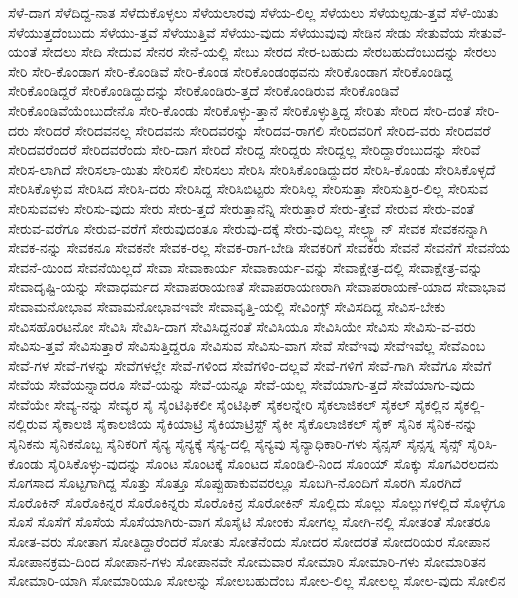 {ಸೆಳೆ-ದಾಗ
ಸೆಳೆದಿದ್ದ-ನಾತ
ಸೆಳೆದುಕೊಳ್ಳಲು
ಸೆಳೆಯಲಾರವು
ಸೆಳೆಯ-ಲಿಲ್ಲ
ಸೆಳೆಯಲು
ಸೆಳೆಯಲ್ಪಡು-ತ್ತವೆ
ಸೆಳೆ-ಯಿತು
ಸೆಳೆಯುತ್ತದೆಂಬುದು
ಸೆಳೆಯು-ತ್ತವೆ
ಸೆಳೆಯುತ್ತಿವೆ
ಸೆಳೆಯು-ವುದು
ಸೆಳೆಯುವುವು
ಸೇಡಿನ
ಸೇಡು
ಸೇತುವೆಯ
ಸೇತುವೆ-ಯಂತೆ
ಸೇದಲು
ಸೇದಿ
ಸೇದುವ
ಸೇನರ
ಸೇನೆ-ಯಲ್ಲಿ
ಸೇಬು
ಸೇರದ
ಸೇರ-ಬಹುದು
ಸೇರಬಹುದೆಂಬುದನ್ನು
ಸೇರಲು
ಸೇರಿ
ಸೇರಿ-ಕೊಂಡಾಗ
ಸೇರಿ-ಕೊಂಡಿವೆ
ಸೇರಿ-ಕೊಂಡ
ಸೇರಿಕೊಂಡಂಥವನು
ಸೇರಿಕೊಂಡಾಗ
ಸೇರಿಕೊಂಡಿದ್ದ
ಸೇರಿಕೊಂಡಿದ್ದರೆ
ಸೇರಿಕೊಂಡಿದ್ದುದನ್ನು
ಸೇರಿಕೊಂಡಿರು-ತ್ತದೆ
ಸೇರಿಕೊಂಡಿರುವ
ಸೇರಿಕೊಂಡಿವೆ
ಸೇರಿಕೊಂಡಿವೆಯೆಂಬುದೇನೊ
ಸೇರಿ-ಕೊಂಡು
ಸೇರಿಕೊಳ್ಳು-ತ್ತಾನೆ
ಸೇರಿಕೊಳ್ಳುತ್ತಿದ್ದ
ಸೇರಿತು
ಸೇರಿದ
ಸೇರಿ-ದಂತೆ
ಸೇರಿ-ದರು
ಸೇರಿದರೆ
ಸೇರಿದವನಲ್ಲ
ಸೇರಿದವನು
ಸೇರಿದವರನ್ನು
ಸೇರಿದವ-ರಾಗಲಿ
ಸೇರಿದವರಿಗೆ
ಸೇರಿದ-ವರು
ಸೇರಿದವರೆ
ಸೇರಿದವರೆಂದರೆ
ಸೇರಿದವರೆಂದು
ಸೇರಿ-ದಾಗ
ಸೇರಿದೆ
ಸೇರಿದ್ದ
ಸೇರಿದ್ದರು
ಸೇರಿದ್ದಲ್ಲ
ಸೇರಿದ್ದಾರೆಂಬುದನ್ನು
ಸೇರಿವೆ
ಸೇರಿಸ-ಲಾಗಿದೆ
ಸೇರಿಸಲಾ-ಯಿತು
ಸೇರಿಸಲಿ
ಸೇರಿಸಲು
ಸೇರಿಸಿ
ಸೇರಿಸಿಕೊಂಡಿದ್ದುದರ
ಸೇರಿಸಿ-ಕೊಂಡು
ಸೇರಿಸಿಕೊಳ್ಳದೆ
ಸೇರಿಸಿಕೊಳ್ಳುವ
ಸೇರಿಸಿದ
ಸೇರಿಸಿ-ದರು
ಸೇರಿಸಿದ್ದ
ಸೇರಿಸಿಬಿಟ್ಟರು
ಸೇರಿಸಿಲ್ಲ
ಸೇರಿಸುತ್ತಾ
ಸೇರಿಸುತ್ತಿರ-ಲಿಲ್ಲ
ಸೇರಿಸುವ
ಸೇರಿಸುವವಳು
ಸೇರಿಸು-ವುದು
ಸೇರು
ಸೇರು-ತ್ತದೆ
ಸೇರುತ್ತಾನೆನ್ನಿ
ಸೇರುತ್ತಾರೆ
ಸೇರು-ತ್ತೇವೆ
ಸೇರುವ
ಸೇರು-ವಂತೆ
ಸೇರುವ-ವರೆಗೂ
ಸೇರುವ-ವರೆಗೆ
ಸೇರುವುದಂತೂ
ಸೇರುವು-ದಕ್ಕೆ
ಸೇರು-ವುದಿಲ್ಲ
ಸೇಲ್ಸ್ಮ್ಯಾನ್
ಸೇವಕ
ಸೇವಕನನ್ನಾಗಿ
ಸೇವಕ-ನನ್ನು
ಸೇವಕನೂ
ಸೇವಕನೇ
ಸೇವಕ-ರಲ್ಲ
ಸೇವಕ-ರಾಗ-ಬೇಡಿ
ಸೇವಕರಿಗೆ
ಸೇವಕರು
ಸೇವನೆ
ಸೇವನೆಗೆ
ಸೇವನೆಯ
ಸೇವನೆ-ಯಿಂದ
ಸೇವನೆಯಿಲ್ಲದೆ
ಸೇವಾ
ಸೇವಾಕಾರ್ಯ
ಸೇವಾಕಾರ್ಯ-ವನ್ನು
ಸೇವಾಕ್ಷೇತ್ರ-ದಲ್ಲಿ
ಸೇವಾಕ್ಷೇತ್ರ-ವನ್ನು
ಸೇವಾದೃಷ್ಟಿ-ಯನ್ನು
ಸೇವಾಧರ್ಮದ
ಸೇವಾಪರಾಯಣತೆ
ಸೇವಾಪರಾಯಣರಾಗಿ
ಸೇವಾಪರಾಯಣೆ-ಯಾದ
ಸೇವಾಭಾವ
ಸೇವಾಮನೋಭಾವ
ಸೇವಾಮನೋಭಾವಇವೇ
ಸೇವಾವೃತ್ತಿ-ಯಲ್ಲಿ
ಸೇವಿಂಗ್ಸ್
ಸೇವಿಸದಿದ್ದ
ಸೇವಿಸ-ಬೇಕು
ಸೇವಿಸಹೊರಟನೋ
ಸೇವಿಸಿ
ಸೇವಿಸಿ-ದಾಗ
ಸೇವಿಸಿದ್ದನಂತೆ
ಸೇವಿಸಿಯೂ
ಸೇವಿಸಿಯೇ
ಸೇವಿಸು
ಸೇವಿಸು-ವ-ವರು
ಸೇವಿಸು-ತ್ತವೆ
ಸೇವಿಸುತ್ತಾರೆ
ಸೇವಿಸುತ್ತಿದ್ದರೂ
ಸೇವಿಸುವ
ಸೇವಿಸು-ವಾಗ
ಸೇವೆ
ಸೇವೆಇವು
ಸೇವೆಇವೆಲ್ಲ
ಸೇವೆಎಂಬ
ಸೇವೆ-ಗಳ
ಸೇವೆ-ಗಳನ್ನು
ಸೇವೆಗಳಲ್ಲೇ
ಸೇವೆ-ಗಳಿಂದ
ಸೇವೆಗಳಿಂ-ದಲ್ಲವೆ
ಸೇವೆ-ಗಳಿಗೆ
ಸೇವೆ-ಗಾಗಿ
ಸೇವೆಗೂ
ಸೇವೆಗೆ
ಸೇವೆಯ
ಸೇವೆಯನ್ನಾದರೂ
ಸೇವೆ-ಯನ್ನು
ಸೇವೆ-ಯನ್ನೂ
ಸೇವೆ-ಯಲ್ಲ
ಸೇವೆಯಾಗು-ತ್ತದೆ
ಸೇವೆಯಾಗು-ವುದು
ಸೇವೆಯೇ
ಸೇವ್ಯ-ನನ್ನು
ಸೇವ್ಯರ
ಸೈ
ಸೈಂಟಿಫಿಕಲೀ
ಸೈಂಟಿಫಿಕ್
ಸೈಕಲನ್ನೇರಿ
ಸೈಕಲಾಜಿಕಲ್
ಸೈಕಲ್
ಸೈಕಲ್ಲಿನ
ಸೈಕಲ್ಲಿ-ನಲ್ಲಿರುವ
ಸೈಕಾಲಜಿ
ಸೈಕಾಲಜಿಯ
ಸೈಕಿಯಾಟ್ರಿ
ಸೈಕಿಯಾಟ್ರಿಸ್ಟ್
ಸೈಕೀ
ಸೈಕೊಲಾಜಿಕಲ್
ಸೈಕ್
ಸೈನಿಕ
ಸೈನಿಕ-ನನ್ನು
ಸೈನಿಕನು
ಸೈನಿಕನೊಬ್ಬ
ಸೈನಿಕರಿಗೆ
ಸೈನ್ಯ
ಸೈನ್ಯಕ್ಕೆ
ಸೈನ್ಯ-ದಲ್ಲಿ
ಸೈನ್ಯವು
ಸೈನ್ಯಾಧಿಕಾರಿ-ಗಳು
ಸೈನ್ಸಸ್
ಸೈನ್ಸಸ್ನ
ಸೈನ್ಸ್
ಸೈರಿಸಿ-ಕೊಂಡು
ಸೈರಿಸಿಕೊಳ್ಳು-ವುದನ್ನು
ಸೊಂಟ
ಸೊಂಟಕ್ಕೆ
ಸೊಂಟದ
ಸೊಂಡಿಲಿ-ನಿಂದ
ಸೊಂಯ್
ಸೊಕ್ಕು
ಸೊಗವಿರಲದನು
ಸೊಗಸಾದ
ಸೊಟ್ಟಗಾಗಿದ್ದ
ಸೊತ್ತು
ಸೊತ್ತೂ
ಸೊಪ್ಪುಹಾಕುವವರಲ್ಲೂ
ಸೊಬಗಿ-ನೊಂದಿಗೆ
ಸೊರಗಿ
ಸೊರಗಿದೆ
ಸೊರೊಕಿನ್
ಸೊರೊಕಿನ್ನರ
ಸೊರೊಕಿನ್ನರು
ಸೊರೊಕಿನ್ರ
ಸೊರೋಕಿನ್
ಸೊಲ್ಲಿದು
ಸೊಲ್ಲು
ಸೊಲ್ಲುಗಳಲ್ಲಿದೆ
ಸೊಳ್ಳೆಗೂ
ಸೊಸೆ
ಸೊಸೆಗೆ
ಸೊಸೆಯ
ಸೊಸೆಯಾಗಿರು-ವಾಗ
ಸೊಸೈಟಿ
ಸೋಂಕು
ಸೋಗಲ್ಲ
ಸೋಗಿ-ನಲ್ಲಿ
ಸೋತಂತೆ
ಸೋತರೂ
ಸೋತ-ವರು
ಸೋತಾಗ
ಸೋತಿದ್ದಾರೆಂದರೆ
ಸೋತು
ಸೋತೆನೆಂದು
ಸೋದರ
ಸೋದರತೆ
ಸೋದರಿಯರ
ಸೋಪಾನ
ಸೋಪಾನಕ್ರಮ-ದಿಂದ
ಸೋಪಾನ-ಗಳು
ಸೋಪಾನವೇ
ಸೋಮವಾರ
ಸೋಮಾರಿ
ಸೋಮಾರಿ-ಗಳು
ಸೋಮಾರಿತನ
ಸೋಮಾರಿ-ಯಾಗಿ
ಸೋಮಾರಿಯೂ
ಸೋಲನ್ನು
ಸೋಲಬಹುದೆಂಬ
ಸೋಲ-ಲಿಲ್ಲ
ಸೋಲಲ್ಲ
ಸೋಲ-ವುದು
ಸೋಲಿನ
}
